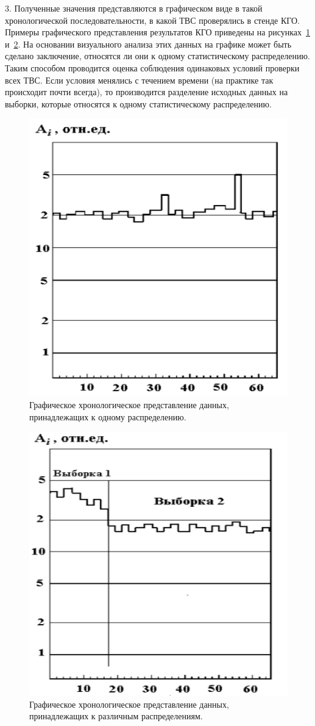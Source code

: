 3. Полученные значения представляются в графическом виде в такой
хронологической последовательности, в какой ТВС проверялись в стенде
КГО. Примеры графического представления результатов КГО приведены на
рисунках~\ref{fig:ris1} и~\ref{fig:ris2}. На основании визуального анализа этих данных на графике
может быть сделано заключение, относятся ли они к одному статистическому
распределению. Таким способом проводится оценка соблюдения одинаковых
условий проверки всех ТВС.\label{distribution} Если условия менялись с течением времени (на
практике так происходит почти всегда), то производится разделение исходных данных на выборки, которые относятся к одному статистическому распределению.

\begin{figure}[H]
	\centering
	\includegraphics[width=0.5\linewidth]{pics/ris1} %
	\caption{Графическое хронологическое представление данных, принадлежащих к одному распределению.~\cite{RD}}
	\label{fig:ris1} %
\end{figure}

\begin{figure}[H]
	\centering
	\includegraphics[width=0.5\linewidth]{pics/ris2} %
	\caption{Графическое хронологическое представление данных, принадлежащих к различным распределениям.~\cite{RD}}
	\label{fig:ris2} %
\end{figure}

